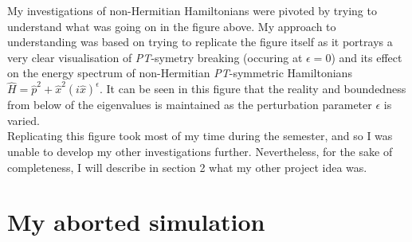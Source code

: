 \documentclass[10pt, a4paper, singlespacing, headsepline]{article}
\newcommand\PT{\textit{PT}}
\begin{document}
My investigations of non-Hermitian Hamiltonians were pivoted by trying to understand what was going on in the figure above. My approach to understanding was based on trying to replicate the figure itself as it portrays a very clear visualisation of \PT-symetry breaking (occuring at $\epsilon = 0$) and its effect on the energy spectrum of non-Hermitian \PT-symmetric Hamiltonians $\hat{H} = \hat{p}^2 + \hat{x}^2 (i \hat{x})^{\epsilon}$. It can be seen in this figure that the reality and boundedness from below of the eigenvalues is maintained as the perturbation parameter $\epsilon$ is varied.\\
Replicating this figure took most of my time during the semester, and so I was unable to develop my other investigations further. Nevertheless, for the sake of completeness, I will describe in section 2 what my other project idea was.

\section{My aborted simulation}
\end{document}
